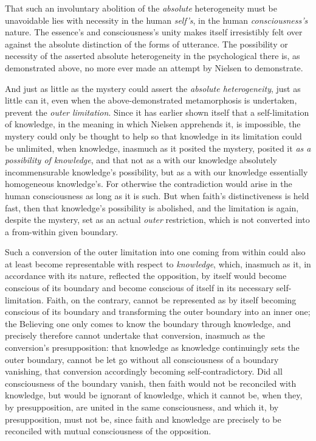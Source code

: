 \documentclass[12pt,a4paper]{book}
\begin{document}
That such an involuntary abolition of the \emph{absolute} heterogeneity must be unavoidable lies with necessity
in the human \emph{self's}, in the human \emph{consciousness's} nature. The essence's and consciousness's unity
makes itself irresistibly felt over against the absolute distinction of the forms of utterance. The possibility
or necessity of the asserted absolute heterogeneity in the psychological there is, as demonstrated above, no more
ever made an attempt by Nielsen to demonstrate.

And just as little as the mystery could assert the \emph{absolute heterogeneity}, just as little can it, even when the
above-demonstrated metamorphosis is undertaken, prevent the \emph{outer limitation}. Since it has earlier shown
itself that a self-limitation of knowledge, in the meaning in which Nielsen apprehends it, is impossible, the
mystery could only be thought to help so that knowledge in its limitation could be unlimited, when knowledge,
inasmuch as it posited the mystery, posited it \emph{as a possibility of knowledge}, and that not as a with our
knowledge absolutely incommensurable knowledge's possibility, but as a with our knowledge essentially
homogeneous knowledge's. For otherwise the contradiction would arise in the human consciousness as long as it is
such. But when faith's distinctiveness is held fast, then that knowledge's possibility is abolished, and the
limitation is again, despite the mystery, set as an actual \emph{outer} restriction, which is not converted into
a from-within given boundary.

Such a conversion of the outer limitation into one coming from within could also at least become representable
with respect to \emph{knowledge}, which, inasmuch as it, in accordance with its nature, reflected the opposition, by
itself would become conscious of its boundary and become conscious of itself in its necessary self-limitation.
Faith, on the contrary, cannot be represented as by itself becoming conscious of its boundary and transforming
the outer boundary into an inner one; the Believing one only comes to know the boundary through knowledge, and
precisely therefore cannot undertake that conversion, inasmuch as the conversion's presupposition: that knowledge
as knowledge continuingly sets the outer boundary, cannot be let go without all consciousness of a boundary
vanishing, that conversion accordingly becoming self-contradictory. Did all consciousness of the boundary vanish,
then faith would not be reconciled with knowledge, but would be ignorant of knowledge, which it cannot be, when
they, by presupposition, are united in the same consciousness, and which it, by presupposition, must not be, since
faith and knowledge are precisely to be reconciled with mutual consciousness of the opposition.
\end{document}
